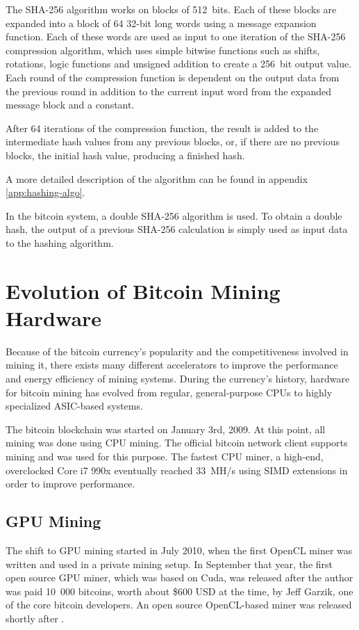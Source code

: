 The SHA-256 algorithm works on blocks of 512~bits. Each of these blocks are expanded into a
block of 64 32-bit long words using a message expansion function. Each of these words are
used as input to one iteration of the SHA-256 compression algorithm, which uses simple bitwise functions
such as shifts, rotations, logic functions and unsigned addition to create a 256~bit
output value. Each round of the compression function is dependent on the output data from
the previous round in addition to the current input word from the expanded message block
and a constant.

After 64 iterations of the compression function, the result is added to the intermediate
hash values from any previous blocks, or, if there are no previous blocks, the initial
hash value, producing a finished hash.

A more detailed description of the algorithm can be found in appendix \ref{app:hashing-algo}.

In the bitcoin system, a double SHA-256 algorithm is used. To obtain a double hash, the
output of a previous SHA-256 calculation is simply used as input data to the hashing
algorithm. \cite{fips180-4}


\section{Evolution of Bitcoin Mining Hardware}
\label{sec:bitcoin-history}

Because of the bitcoin currency's popularity and the competitiveness involved in mining it, there exists
many different accelerators to improve the performance and energy efficiency of mining systems.
During the currency's history, hardware for bitcoin mining has evolved from regular, general-purpose
CPUs to highly specialized ASIC-based systems.

The bitcoin blockchain was started on January 3rd, 2009. At this point, all mining was done
using CPU mining. The official bitcoin network client supports mining and was used for this
purpose. The fastest CPU miner, a high-end, overclocked Core i7 990x eventually reached 33~MH/s
using SIMD extensions in order to improve performance. \cite{bitcoin-history}

\subsection{GPU Mining}
The shift to GPU mining started in July 2010, when the first OpenCL miner was written and
used in a private mining setup. In September that year, the first open source GPU miner,
which was based on Cuda, was released after the author was paid 10~000 bitcoins, worth about
\$600 USD at the time, by Jeff Garzik, one of the core bitcoin developers. An open source
OpenCL-based miner was released shortly after \cite{bitcoin-history}.

